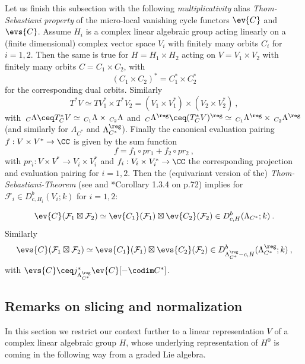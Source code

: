 \documentclass[11pt,letterpaper]{amsart}
\numberwithin{equation}{section}
\begin{document}
Let us finish this subsection with the following {\it multiplicativity} alias {\it Thom-Sebastiani property} of 
the micro-local vanishing cycle functors  $\ev{C}$ and $\evs{C}$.
Assume $H_i$  is a complex linear algebraic group 
acting linearly on a (finite dimensional) complex vector space $V_i$ with finitely many orbits $C_i$ for $i=1,2$.
Then the same is true for $H=H_1\times H_2$ acting on
$V=V_1 \times V_2$ with finitely many orbits $C=C_1\times C_2$, with
$$(C_1\times C_2)^*=C_1^*\times C_2^*$$
for the corresponding dual orbits. Similarly 
$$T^*V\simeq TV^*_1\times T^*V_2 = (V_1\times V_1^*)\times (V_2\times V_2^*)\:,$$
with $\,_C\Lambda \ceq T^*_{C}V\simeq \,_{C_1}\Lambda\times \,_{C_2}\Lambda$ and
$\,_C\Lambda^\reg \ceq (T^*_{C}V)^\reg \simeq \,_{C_1}\Lambda^\reg\times \,_{C_2}\Lambda^\reg$
(and similarly for $\Lambda_{C^*}$ and $\Lambda_{C^*}^\reg$).
Finally the canonical evaluation pairing $f:V\times V^*\to \CC$ is given by the sum function 
$$f=f_1\circ pr_1 + f_2\circ pr_2 \:,$$
with $pr_i: V\times V^*\to V_i\times V_i^*$ and $f_i: V_i\times V_i^*\to \CC$ the corresponding projection and evaluation pairing for $i=1,2$.
Then the (equivariant version of the) {\it Thom-Sebastiani-Theorem} (see \cite{Ma01} and 
\cite{Sch03}*{Corollary 1.3.4 on p.72}) implies for $\mathcal{F}_i\in D^b_{c,H_i}(V_i;k)$ for $i=1,2$:

\begin{equation}\label{TS-theorem}
  \ev{C}(\mathcal{F}_1\boxtimes \mathcal{F}_2)
  \simeq \ev{C_1}(\mathcal{F}_1) \boxtimes
  \ev{C_2}(\mathcal{F}_2) \in  D^b_{c,H}(\Lambda_{C^*};k) \:.
\end{equation}
Similarly
\begin{equation}\label{TS-theorem2}
  \evs{C}(\mathcal{F}_1\boxtimes \mathcal{F}_2)
  \simeq \evs{C_1}(\mathcal{F}_1) \boxtimes
  \evs{C_2}(\mathcal{F}_2) \in  D^b_{\Lambda^\reg_{C^*}-c,H}(\Lambda^\reg_{C^*};k) \:,
\end{equation}
with $\evs{C} \ceq j^*_{\Lambda_{C^*}^\reg} \ev{C}[-\codim C^*]$.

\subsection{Remarks on slicing and normalization} 
\label{subsection: normalization}
In this section we restrict our context further to  a linear representation $V$ of a complex linear algebraic group $H$, whose underlying representation of $H^0$ is coming in the following way from a graded Lie algebra.
\end{document}
